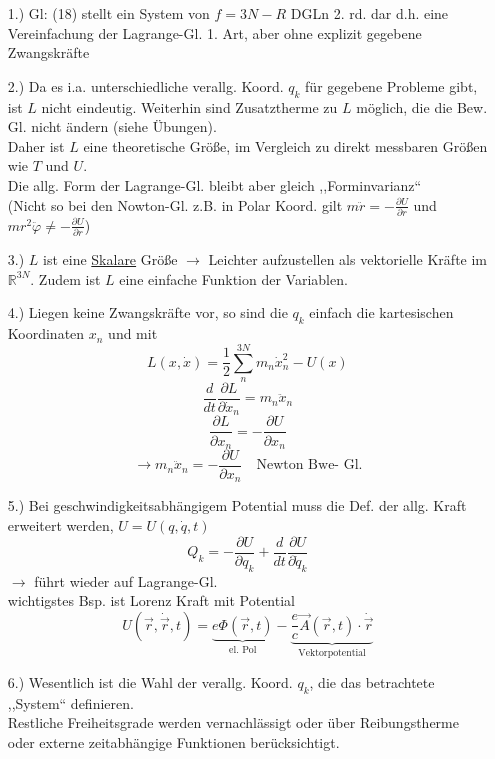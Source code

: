 \documentclass[titlepage,12pt,a4paper,ngerman]{report}
\newcommand{\tx}[1]{\textrm{#1}}
\newcommand{\ub}[1]{\underbrace{#1}}
\begin{document}
\begin{itemize}
	\item[1.)] Gl: (18) stellt ein System von $ f = 3N - R $ DGLn 2. rd. dar d.h. eine Vereinfachung der Lagrange-Gl. 1. Art, aber ohne explizit gegebene Zwangskräfte
	\item[2.)] Da es i.a. unterschiedliche verallg. Koord. $ q_k $ für gegebene Probleme gibt, ist $ L $ nicht eindeutig. Weiterhin sind Zusatztherme zu $ L $ möglich, die die Bew. Gl. nicht ändern (siehe Übungen).\\
	Daher ist $ L $ eine theoretische Größe, im Vergleich zu direkt messbaren Größen wie $ T $ und $ U $.\\
	Die allg. Form der Lagrange-Gl. bleibt aber gleich ,,Forminvarianz``\\
	(Nicht so bei den Nowton-Gl. z.B. in Polar Koord. gilt $ m\ddot{r} = -\frac{\partial U}{\partial r} $ und $ m r^2 \ddot{\varphi} \neq - \frac{\partial U}{\partial r} $)
	\item[3.)] $ L $ ist eine \underline{Skalare} Größe $ \rightarrow $ Leichter aufzustellen als vektorielle Kräfte im $ \mathbb{R}^{3N} $. Zudem ist $ L $ eine einfache Funktion der Variablen.
	\item[4.)] Liegen keine Zwangskräfte vor, so sind die $ q_k $ einfach die kartesischen Koordinaten $ x_n $ und mit
	$$L(x,\dot{x}) = \frac{1}{2} \sum_n^{3N} m_n \dot{x}^2_n - U(x)$$
	$$\frac{d}{dt} \frac{\partial L}{\partial \dot{x}_n} = m_n \ddot{x}_n$$
	$$\frac{\partial L}{\partial x_n} = - \frac{\partial U}{\partial x_n}$$
	$$ \rightarrow m_n \ddot{x}_n = - \frac{\partial U}{\partial x_n} \quad \tx{Newton Bwe- Gl.}$$
	\item[5.)] Bei geschwindigkeitsabhängigem Potential muss die Def. der allg. Kraft erweitert werden, $ U = U(q,\dot{q},t) $
	$$ Q_k = - \frac{\partial U}{\partial q_k} + \frac{d}{dt} \frac{\partial U}{\partial \dot{q}_k}$$
	$ \rightarrow $ führt wieder auf Lagrange-Gl.\\
	wichtigstes Bsp. ist Lorenz Kraft mit Potential
	$$U(\vec{r}, \dot{\vec{r}}, t) = \ub{e \Phi (\vec{r},t)}_{\tx{el. Pol}} - \ub{\frac{e}{c} \vec{A} (\vec{r},t) \cdot \dot{\vec{r}}}_{\tx{Vektorpotential}}$$
	\item[6.)] Wesentlich ist die Wahl der verallg. Koord. $ q_k $, die das betrachtete ,,System`` definieren.\\
	Restliche Freiheitsgrade werden vernachlässigt oder über Reibungstherme oder externe zeitabhängige Funktionen berücksichtigt.
\end{itemize}
\end{document}
